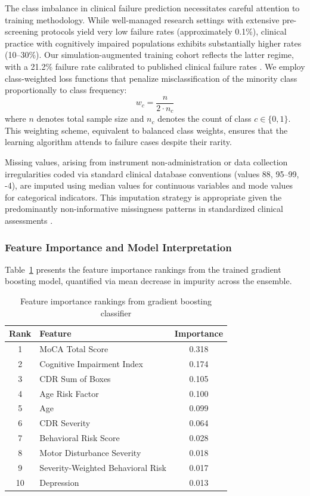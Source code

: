 \documentclass[msom,blindrev]{informs3}
\begin{document}
The class imbalance in clinical failure prediction necessitates careful attention to training methodology. While well-managed research settings with extensive pre-screening protocols yield very low failure rates (approximately 0.1\%), clinical practice with cognitively impaired populations exhibits substantially higher rates (10--30\%). Our simulation-augmented training cohort reflects the latter regime, with a 21.2\% failure rate calibrated to published clinical failure rates \citep{porembka2025disparities}. We employ class-weighted loss functions that penalize misclassification of the minority class proportionally to class frequency:
\begin{equation}
w_c = \frac{n}{2 \cdot n_c}
\end{equation}
where $n$ denotes total sample size and $n_c$ denotes the count of class $c \in \{0, 1\}$. This weighting scheme, equivalent to balanced class weights, ensures that the learning algorithm attends to failure cases despite their rarity.

Missing values, arising from instrument non-administration or data collection irregularities coded via standard clinical database conventions (values 88, 95--99, -4), are imputed using median values for continuous variables and mode values for categorical indicators. This imputation strategy is appropriate given the predominantly non-informative missingness patterns in standardized clinical assessments \citep{sterne2009multiple}.

\subsubsection{Feature Importance and Model Interpretation}

Table~\ref{tab:feature_importance} presents the feature importance rankings from the trained gradient boosting model, quantified via mean decrease in impurity across the ensemble.

\begin{table}[htbp]
\centering
\caption{Feature importance rankings from gradient boosting classifier}
\label{tab:feature_importance}
\begin{tabular}{@{}clc@{}}
\toprule
\textbf{Rank} & \textbf{Feature} & \textbf{Importance} \\
\midrule
1 & MoCA Total Score & 0.318 \\
2 & Cognitive Impairment Index & 0.174 \\
3 & CDR Sum of Boxes & 0.105 \\
4 & Age Risk Factor & 0.100 \\
5 & Age & 0.099 \\
6 & CDR Severity & 0.064 \\
7 & Behavioral Risk Score & 0.028 \\
8 & Motor Disturbance Severity & 0.018 \\
9 & Severity-Weighted Behavioral Risk & 0.017 \\
10 & Depression & 0.013 \\
\bottomrule
\end{tabular}
\end{table}
\end{document}

